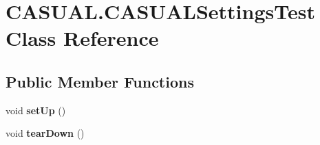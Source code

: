 \hypertarget{class_c_a_s_u_a_l_1_1_c_a_s_u_a_l_settings_test}{\section{C\-A\-S\-U\-A\-L.\-C\-A\-S\-U\-A\-L\-Settings\-Test Class Reference}
\label{class_c_a_s_u_a_l_1_1_c_a_s_u_a_l_settings_test}
}
\subsection*{Public Member Functions}
\begin{DoxyCompactItemize}
\item 
\hypertarget{class_c_a_s_u_a_l_1_1_c_a_s_u_a_l_settings_test_a778ee1f88ca98895e5502c17576df334}{void {\bfseries set\-Up} ()}\label{class_c_a_s_u_a_l_1_1_c_a_s_u_a_l_settings_test_a778ee1f88ca98895e5502c17576df334}

\item 
\hypertarget{class_c_a_s_u_a_l_1_1_c_a_s_u_a_l_settings_test_ae14db97df439142ca8e9720b796905d1}{void {\bfseries tear\-Down} ()}\label{class_c_a_s_u_a_l_1_1_c_a_s_u_a_l_settings_test_ae14db97df439142ca8e9720b796905d1}


\end{DoxyCompactItemize}

